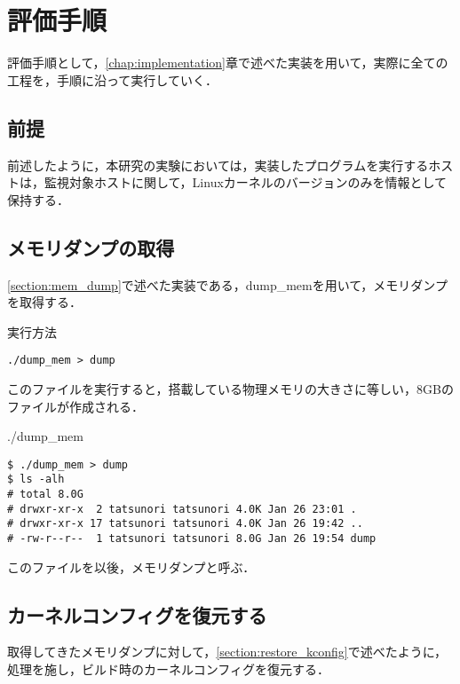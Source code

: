 \section{評価手順}
\label{section:eval}

評価手順として，\ref{chap:implementation}章で述べた実装を用いて，実際に全ての工程を，手順に沿って実行していく．

\subsection{前提}

前述したように，本研究の実験においては，実装したプログラムを実行するホストは，監視対象ホストに関して，Linuxカーネルのバージョンのみを情報として保持する．

\subsection{メモリダンプの取得}
\label{subsection:eval_dump_mem}

\ref{section:mem_dump}で述べた実装である，dump_memを用いて，メモリダンプを取得する．

\begin{itembox}[l]{実行方法}
    \begin{verbatim}
./dump_mem > dump
    \end{verbatim}
\end{itembox}

このファイルを実行すると，搭載している物理メモリの大きさに等しい，8GBのファイルが作成される．

\begin{itembox}[l]{./dump_mem}
    \begin{verbatim}
$ ./dump_mem > dump
$ ls -alh
# total 8.0G
# drwxr-xr-x  2 tatsunori tatsunori 4.0K Jan 26 23:01 .
# drwxr-xr-x 17 tatsunori tatsunori 4.0K Jan 26 19:42 ..
# -rw-r--r--  1 tatsunori tatsunori 8.0G Jan 26 19:54 dump
    \end{verbatim}
\end{itembox}

このファイルを以後，メモリダンプと呼ぶ．

\subsection{カーネルコンフィグを復元する}
\label{subsection:eval_restore_kconfig}

取得してきたメモリダンプに対して，\ref{section:restore_kconfig}で述べたように，処理を施し，ビルド時のカーネルコンフィグを復元する．

